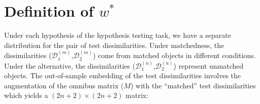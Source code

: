 \documentclass[12pt]{article} %
\begin{document}
 

\section{Definition of  $w^{*}$}

Under each hypothesis  of the hypothesis testing  task, we have a separate distribution for  the pair of test dissimilarities. Under matchedness, the dissimilarities ($\mathcal{D}_1^{(m)}$,$\mathcal{D}_2^{(m)}$) come from matched objects in different conditions. Under the alternative, the dissimilarities  ($\mathcal{D}_1^{(u)}$,$\mathcal{D}_2^{(u)}$) represent unmatched objects. The out-of-sample embedding of the test dissimilarities involves the  augmentation of  the omnibus matrix ($M$) with the ``matched'' test dissimilarities which yields a $(2n+2)\times (2n+2)$ matrix:
\end{document}
